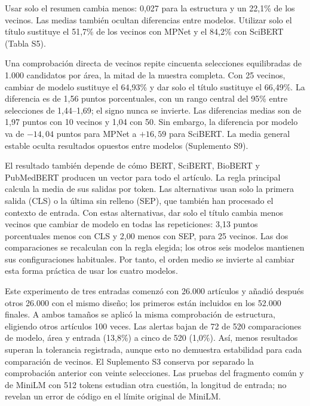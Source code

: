 \documentclass[12pt]{article}
\begin{document}
Usar solo el resumen cambia menos: 0,027 para la estructura y un 22,1\% de los vecinos. Las medias también ocultan diferencias entre modelos. Utilizar solo el título sustituye el 51,7\% de los vecinos con MPNet y el 84,2\% con SciBERT (Tabla S5).

Una comprobación directa de vecinos repite cincuenta selecciones equilibradas de 1.000 candidatos por área, la mitad de la muestra completa. Con 25 vecinos, cambiar de modelo sustituye el 64,93\% y dar solo el título sustituye el 66,49\%. La diferencia es de 1,56 puntos porcentuales, con un rango central del 95\% entre selecciones de 1,44--1,69; el signo nunca se invierte. Las diferencias medias son de 1,97 puntos con 10 vecinos y 1,04 con 50. Sin embargo, la diferencia por modelo va de $-14,04$ puntos para MPNet a $+16,59$ para SciBERT. La media general estable oculta resultados opuestos entre modelos (Suplemento S9).

El resultado también depende de cómo BERT, SciBERT, BioBERT y PubMedBERT producen un vector para todo el artículo. La regla principal calcula la media de sus salidas por token. Las alternativas usan solo la primera salida (CLS) o la última sin relleno (SEP), que también han procesado el contexto de entrada. Con estas alternativas, dar solo el título cambia menos vecinos que cambiar de modelo en todas las repeticiones: 3,13 puntos porcentuales menos con CLS y 2,00 menos con SEP, para 25 vecinos. Las dos comparaciones se recalculan con la regla elegida; los otros seis modelos mantienen sus configuraciones habituales. Por tanto, el orden medio se invierte al cambiar esta forma práctica de usar los cuatro modelos.

Este experimento de tres entradas comenzó con 26.000 artículos y añadió después otros 26.000 con el mismo diseño; los primeros están incluidos en los 52.000 finales. A ambos tamaños se aplicó la misma comprobación de estructura, eligiendo otros artículos 100 veces. Las alertas bajan de 72 de 520 comparaciones de modelo, área y entrada (13,8\%) a cinco de 520 (1,0\%). Así, menos resultados superan la tolerancia registrada, aunque esto no demuestra estabilidad para cada comparación de vecinos. El Suplemento S3 conserva por separado la comprobación anterior con veinte selecciones. Las pruebas del fragmento común y de MiniLM con 512 tokens estudian otra cuestión, la longitud de entrada; no revelan un error de código en el límite original de MiniLM.

\FloatBarrier
\end{document}
